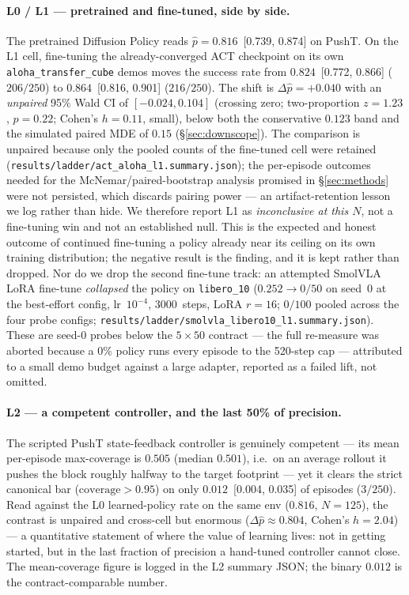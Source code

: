 \documentclass[10pt]{article}
\begin{document}
\paragraph{L0 / L1 --- pretrained and fine-tuned, side by side.}
The pretrained Diffusion Policy reads $\hat{p}{=}0.816$~[0.739, 0.874] on
PushT. On the L1 cell, fine-tuning the already-converged ACT checkpoint on
its own \texttt{aloha\_transfer\_cube} demos moves the success rate from
$0.824$~[0.772, 0.866] ($206/250$) to $0.864$~[0.816, 0.901] ($216/250$).
The shift is $\Delta\hat{p}{=}{+}0.040$ with an \emph{unpaired} 95\% Wald
CI of $[-0.024, 0.104]$ (crossing zero; two-proportion $z{=}1.23$,
$p{=}0.22$; Cohen's $h{=}0.11$, small), below both the conservative
$0.123$ band and the simulated paired MDE of $0.15$
(\S\ref{sec:downscope}). The comparison is unpaired because only the
pooled counts of the fine-tuned cell were retained
(\texttt{results/ladder/act\_aloha\_l1.summary.json}); the per-episode
outcomes needed for the McNemar/paired-bootstrap analysis promised in
\S\ref{sec:methods} were not persisted, which discards pairing power ---
an artifact-retention lesson we log rather than hide. We therefore report
L1 as \emph{inconclusive at this $N$}, not a fine-tuning win and not an
established null. This
is the expected and honest outcome of continued fine-tuning a policy
already near its ceiling on its own training distribution; the negative
result is the finding, and it is kept rather
than dropped. Nor do we drop the second fine-tune track:
an attempted SmolVLA LoRA fine-tune \emph{collapsed} the policy on
\texttt{libero\_10} ($0.252\to0/50$ on seed~0 at the best-effort config,
lr~$10^{-4}$, 3000~steps, LoRA $r{=}16$; $0/100$ pooled across the four
probe configs;
\texttt{results/ladder/smolvla\_libero10\_l1.summary.json}). These are
seed-0 probes below the $5{\times}50$ contract --- the full re-measure
was aborted because a 0\% policy runs every episode to the 520-step
cap --- attributed to a small demo budget against a large adapter,
reported as a failed lift, not omitted.

\paragraph{L2 --- a competent controller, and the last 50\% of precision.}
The scripted PushT state-feedback controller is genuinely competent ---
its mean per-episode max-coverage is $0.505$ (median $0.501$),
i.e.\ on an average rollout it pushes the block roughly
halfway to the target footprint --- yet it
clears the strict canonical bar ($\text{coverage}>0.95$) on only
$0.012$~[0.004, 0.035] of episodes ($3/250$). Read against the L0
learned-policy rate on the same env ($0.816$, $N{=}125$), the contrast is
unpaired and cross-cell but enormous ($\Delta\hat{p}{\approx}0.804$,
Cohen's $h{=}2.04$) --- a quantitative statement of
where the value of learning lives: not in getting started, but in the
last fraction of precision a hand-tuned controller cannot close. The
mean-coverage figure is logged in the L2 summary JSON; the binary
$0.012$ is the contract-comparable number.
\end{document}
